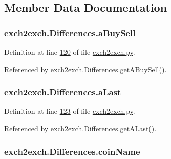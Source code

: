 \subsection{Member Data Documentation}
\subsubsection[{\texorpdfstring{a\+Buy\+Sell}{aBuySell}}]{\setlength{\rightskip}{0pt plus 5cm}exch2exch.\+Differences.\+a\+Buy\+Sell}\hypertarget{classexch2exch_1_1_differences_aac9b76364eb6e0ee83417c0128aaa001}{}\label{classexch2exch_1_1_differences_aac9b76364eb6e0ee83417c0128aaa001}


Definition at line \hyperlink{exch2exch_8py_source_l00120}{120} of file \hyperlink{exch2exch_8py_source}{exch2exch.\+py}.



Referenced by \hyperlink{exch2exch_8py_source_l00138}{exch2exch.\+Differences.\+get\+A\+Buy\+Sell()}.

\subsubsection[{\texorpdfstring{a\+Last}{aLast}}]{\setlength{\rightskip}{0pt plus 5cm}exch2exch.\+Differences.\+a\+Last}\hypertarget{classexch2exch_1_1_differences_abd4dd96bd69025147d0bdb33d9c69345}{}\label{classexch2exch_1_1_differences_abd4dd96bd69025147d0bdb33d9c69345}


Definition at line \hyperlink{exch2exch_8py_source_l00123}{123} of file \hyperlink{exch2exch_8py_source}{exch2exch.\+py}.



Referenced by \hyperlink{exch2exch_8py_source_l00144}{exch2exch.\+Differences.\+get\+A\+Last()}.

\subsubsection[{\texorpdfstring{coin\+Name}{coinName}}]{\setlength{\rightskip}{0pt plus 5cm}exch2exch.\+Differences.\+coin\+Name}\hypertarget{classexch2exch_1_1_differences_a0fb17548553b86b0ae62c2ef1a30981b}{}\label{classexch2exch_1_1_differences_a0fb17548553b86b0ae62c2ef1a30981b}


